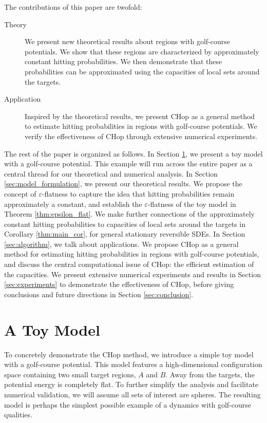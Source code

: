 \documentclass[english, aip, jcp, priprint, graphicx,floatfix]{revtex4-1}
\theoremstyle{plain}
\theoremstyle{definition}
\theoremstyle{plain}
\begin{document}
The contributions of this paper are twofold:

\begin{description}
	\item[Theory] We present new theoretical results about regions with golf-course potentials.  We show that these regions are characterized by approximately constant hitting probabilities.  We then demonstrate that these probabilities can be approximated using the capacities of local sets around the targets.
	\item[Application] Inspired by the theoretical results, we present CHop as a general method to estimate hitting probabilities in regions with golf-course potentials.  We verify the effectiveness of CHop through extensive numerical experiments.
\end{description}

The rest of the paper is organized as follows. In Section \ref{sec:toy_model}, we present a toy model with a golf-course potential.  This example will run across the entire paper as a central thread for our theoretical and numerical analysis. In Section \ref{sec:model_formulation}, we present our theoretical results. We propose the concept of $\varepsilon$-flatness to capture the idea that hitting probabilities remain approximately a constant, and establish the $\varepsilon$-flatness of the toy model in Theorem \ref{thm:epsilon_flat}. We make further connections of the approximately constant hitting probabilities to capacities of local sets around the targets in Corollary \ref{thm:main_cor}, for general stationary reversible SDEs. In Section \ref{sec:algorithm}, we talk about applications. We propose CHop as a general method for estimating hitting probabilities in regions with golf-course potentials, and discuss the central computational issue of CHop: the efficient estimation of the capacities. We present extensive numerical experiments and results in Section \ref{sec:experiments} to demonstrate the effectiveness of CHop, before giving conclusions and future directions in Section \ref{sec:conclusion}.

\section{A Toy Model}\label{sec:toy_model}

To concretely demonstrate the CHop method, we introduce a simple toy model with a golf-course potential.  This model features a high-dimensional configuration space containing two small target regions, $A$ and $B$.  Away from the targets, the potential energy is completely flat.  To further simplify the analysis and facilitate numerical validation, we will assume all sets of interest are spheres.  The resulting model is perhaps the simplest possible example of a dynamics with golf-course qualities.  
\end{document}
